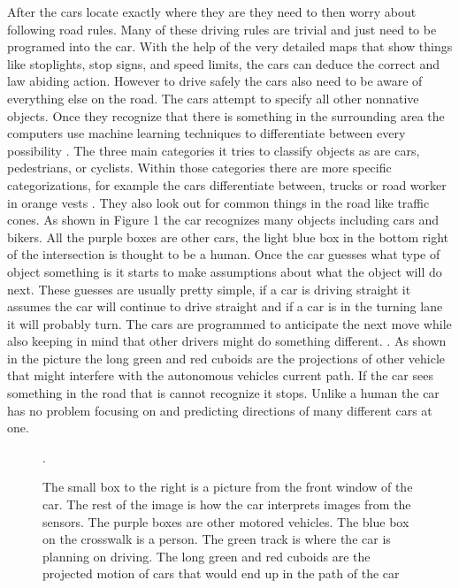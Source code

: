 \documentclass[11pt]{article}
\begin{document}
After the cars locate exactly where they are they need to then worry about following road rules. Many of these driving rules are trivial and just need to be programed
into the car. With the help of the very detailed maps that show things like stoplights, stop signs, and speed limits, the cars can deduce the correct and
law abiding action. However to drive safely the cars also need to be aware of everything else on the road. The cars attempt to specify all other nonnative
objects. Once they recognize that there is something in the surrounding area the computers use machine learning techniques to
differentiate between every possibility \cite{zhu2012object}. The three main categories it tries to classify objects as are cars, pedestrians, or cyclists.
Within those categories there are more specific categorizations, for example the cars differentiate between, trucks or
road worker in orange vests \cite{zhu2012object}. They also look out for common things in the road like traffic cones. As shown in Figure 1 the car recognizes many objects including cars and bikers. All the purple boxes are other cars, the light
blue box in the bottom right of the intersection is thought to be a human. Once the car guesses what type of object something is it starts to make assumptions
about what the object will do next. These guesses are usually pretty simple, if a car is driving straight it assumes the car will continue to drive straight and if
a car is in the turning lane it will probably turn. The cars are programmed to anticipate the next move while also
keeping in mind that other drivers might do something different. \cite{chrisurmson2016}. As shown in the picture the long green and red cuboids are the projections of other vehicle that might interfere with
the autonomous vehicles current path. If the car sees something in the road that is cannot recognize it stops. Unlike a human the car has no problem focusing on and predicting directions of many different cars at one.  
\begin{figure}[!ht]
  \centering
                  \caption{The small box to the right is a picture from the front window of the car. The rest of the
                      image is how the car interprets images from the sensors. The purple boxes are other motored
                          vehicles. The blue box on the crosswalk is a person. The green track is where the car is planning on driving.
                           The long green and red cuboids are the projected motion of cars that would end up in the
                  path of the car \cite{chrisurmson2016}}.
\end{figure}
\end{document}

